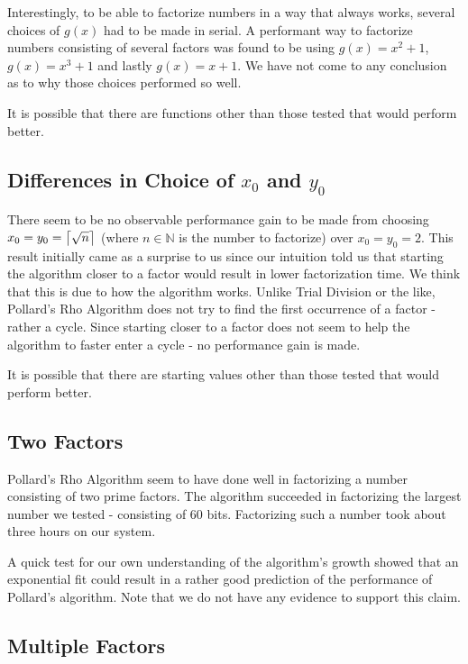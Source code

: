 Interestingly, to be able to factorize numbers in a way that always works, several choices of $g(x)$ had to be made in serial. A performant way to factorize numbers consisting of several factors was found to be using $g(x)=x^2+1$, $g(x)=x^3+1$ and lastly $g(x)=x+1$. We have not come to any conclusion as to why those choices performed so well.

It is possible that there are functions other than those tested that would perform better.

\subsection{Differences in Choice of $x_0$ and $y_0$}

There seem to be no observable performance gain to be made from choosing $x_0=y_0=\ceil[\big]{\sqrt{n}}$ (where $n\in\mathbb{N}$ is the number to factorize) over $x_0=y_0=2$. This result initially came as a surprise to us since our intuition told us that starting the algorithm closer to a factor would result in lower factorization time. We think that this is due to how the algorithm works. Unlike Trial Division or the like, Pollard's Rho Algorithm does not try to find the first occurrence of a factor - rather a cycle. Since starting closer to a factor does not seem to help the algorithm to faster enter a cycle - no performance gain is made.

It is possible that there are starting values other than those tested that would perform better.

\subsection{Two Factors}

Pollard's Rho Algorithm seem to have done well in factorizing a number consisting of two prime factors. The algorithm succeeded in factorizing the largest number we tested - consisting of $60$ bits. Factorizing such a number took about three hours on our system.

A quick test for our own understanding of the algorithm's growth showed that an exponential fit could result in a rather good prediction of the performance of Pollard's algorithm. Note that we do not have any evidence to support this claim.

\subsection{Multiple Factors}


